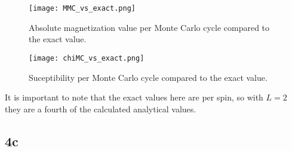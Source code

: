 \documentclass[10pt,showpacs,preprintnumbers,footinbib,amsmath,amssymb,aps,prl,twocolumn,groupedaddress,superscriptaddress,showkeys]{revtex4-1}
\begin{document}
\begin{figure}
	\centering
	\texttt{[image: MMC\_vs\_exact.png]}
	\caption{Absolute magnetization value per Monte Carlo cycle compared to the exact value.}
	\label{fig:4b_Mabs_exact}
\end{figure}

\begin{figure}
	\centering
	\texttt{[image: chiMC\_vs\_exact.png]}
	\caption{Suceptibility per Monte Carlo cycle compared to the exact value.}
	\label{fig:4b_chi_exact}
\end{figure}

It is important to note that the exact values here are per spin, so with $L = 2$ they are a fourth of the calculated analytical values.


\subsection*{4c}
\end{document}
